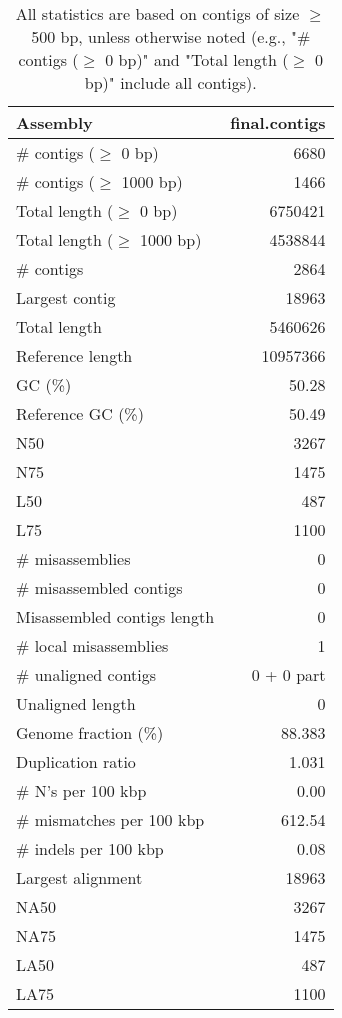 \documentclass[12pt,a4paper]{article}
\begin{document}
\begin{table}[ht]
\begin{center}
\caption{All statistics are based on contigs of size $\geq$ 500 bp, unless otherwise noted (e.g., "\# contigs ($\geq$ 0 bp)" and "Total length ($\geq$ 0 bp)" include all contigs).}
\begin{tabular}{|l*{1}{|r}|}
\hline
Assembly & final.contigs \\ \hline
\# contigs ($\geq$ 0 bp) & 6680 \\ \hline
\# contigs ($\geq$ 1000 bp) & 1466 \\ \hline
Total length ($\geq$ 0 bp) & 6750421 \\ \hline
Total length ($\geq$ 1000 bp) & 4538844 \\ \hline
\# contigs & 2864 \\ \hline
Largest contig & 18963 \\ \hline
Total length & 5460626 \\ \hline
Reference length & 10957366 \\ \hline
GC (\%) & 50.28 \\ \hline
Reference GC (\%) & 50.49 \\ \hline
N50 & 3267 \\ \hline
N75 & 1475 \\ \hline
L50 & 487 \\ \hline
L75 & 1100 \\ \hline
\# misassemblies & 0 \\ \hline
\# misassembled contigs & 0 \\ \hline
Misassembled contigs length & 0 \\ \hline
\# local misassemblies & 1 \\ \hline
\# unaligned contigs & 0 + 0 part \\ \hline
Unaligned length & 0 \\ \hline
Genome fraction (\%) & 88.383 \\ \hline
Duplication ratio & 1.031 \\ \hline
\# N's per 100 kbp & 0.00 \\ \hline
\# mismatches per 100 kbp & 612.54 \\ \hline
\# indels per 100 kbp & 0.08 \\ \hline
Largest alignment & 18963 \\ \hline
NA50 & 3267 \\ \hline
NA75 & 1475 \\ \hline
LA50 & 487 \\ \hline
LA75 & 1100 \\ \hline
\end{tabular}
\end{center}
\end{table}
\end{document}
